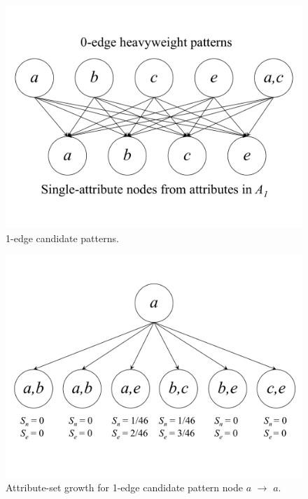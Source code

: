 \begin{figure}[h!]
\centering
    \includegraphics[scale=0.15]{figures/example_1-edge.pdf}
    \caption{1-edge candidate patterns.}
    \label{fig:example_1-edge}  
\end{figure}

\begin{figure}[h!]
\centering
    \includegraphics[scale=0.15]{figures/example_1-edge_2-attribute.pdf}
    \caption{Attribute-set growth for 1-edge candidate pattern node $a$ $\rightarrow$ $a$. }
    \label{fig:example_1-edge_2-attribute}  
\end{figure}


